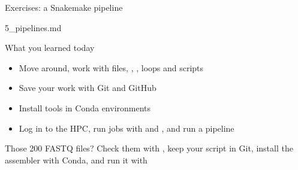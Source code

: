 \begin{frame}{Exercises: a Snakemake pipeline}
\begin{exlist}{5_pipelines.md}
\end{exlist}
\end{frame}

\begin{frame}{What you learned today}
\begin{itemize}
    \item Move around, work with files, , , loops and scripts
    \item Save your work with Git and GitHub
    \item Install tools in Conda environments
    \item Log in to the HPC, run jobs with  and , and run a pipeline
\end{itemize}

\bigskip
Those 200 FASTQ files? Check them with , keep your script in Git,
install the assembler with Conda, and run it with 
\end{frame}
